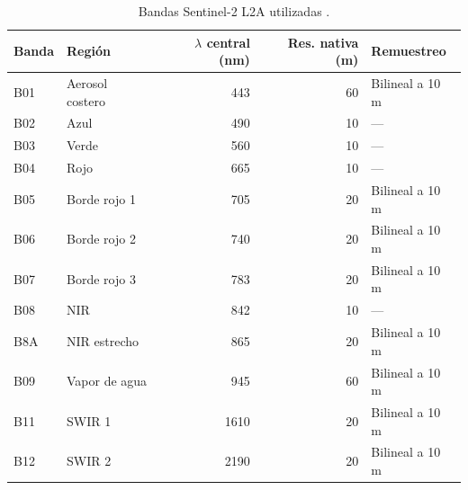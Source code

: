 \begin{table}[htbp]
 \centering
 \caption{Bandas Sentinel-2 L2A utilizadas \parencite{Drusch2012}.}
 \label{tab:bandas}
 \begin{tabular}{llrrl}
  \toprule
  Banda & Región & $\lambda$ central (nm) & Res. nativa (m) & Remuestreo \\
  \midrule
  B01 & Aerosol costero & 443 & 60 & Bilineal a 10 m \\
  B02 & Azul & 490 & 10 & --- \\
  B03 & Verde & 560 & 10 & --- \\
  B04 & Rojo & 665 & 10 & --- \\
  B05 & Borde rojo 1 & 705 & 20 & Bilineal a 10 m \\
  B06 & Borde rojo 2 & 740 & 20 & Bilineal a 10 m \\
  B07 & Borde rojo 3 & 783 & 20 & Bilineal a 10 m \\
  B08 & NIR & 842 & 10 & --- \\
  B8A & NIR estrecho & 865 & 20 & Bilineal a 10 m \\
  B09 & Vapor de agua & 945 & 60 & Bilineal a 10 m \\
  B11 & SWIR 1 & 1610 & 20 & Bilineal a 10 m \\
  B12 & SWIR 2 & 2190 & 20 & Bilineal a 10 m \\
  \bottomrule
 \end{tabular}
\end{table}
